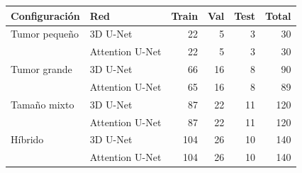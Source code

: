 \begin{tabular}{llrrrr}
\toprule
Configuración & Red & Train & Val & Test & Total \\
\midrule
Tumor pequeño & 3D U-Net & 22 & 5 & 3 & 30 \\
 & Attention U-Net & 22 & 5 & 3 & 30 \\
\addlinespace
Tumor grande & 3D U-Net & 66 & 16 & 8 & 90 \\
 & Attention U-Net & 65 & 16 & 8 & 89 \\
\addlinespace
Tamaño mixto & 3D U-Net & 87 & 22 & 11 & 120 \\
 & Attention U-Net & 87 & 22 & 11 & 120 \\
\addlinespace
Híbrido & 3D U-Net & 104 & 26 & 10 & 140 \\
 & Attention U-Net & 104 & 26 & 10 & 140 \\
\bottomrule
\end{tabular}%